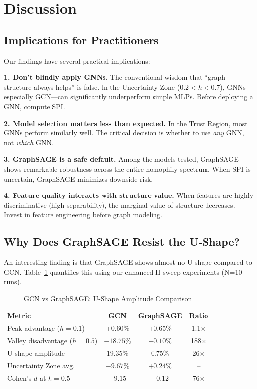 
\section{Discussion}
\label{sec:discussion}

\subsection{Implications for Practitioners}

Our findings have several practical implications:

\textbf{1. Don't blindly apply GNNs.} The conventional wisdom that ``graph structure always helps'' is false. In the Uncertainty Zone ($0.2 < h < 0.7$), GNNs---especially GCN---can significantly underperform simple MLPs. Before deploying a GNN, compute SPI.

\textbf{2. Model selection matters less than expected.} In the Trust Region, most GNNs perform similarly well. The critical decision is whether to use \textit{any} GNN, not \textit{which} GNN.

\textbf{3. GraphSAGE is a safe default.} Among the models tested, GraphSAGE shows remarkable robustness across the entire homophily spectrum. When SPI is uncertain, GraphSAGE minimizes downside risk.

\textbf{4. Feature quality interacts with structure value.} When features are highly discriminative (high separability), the marginal value of structure decreases. Invest in feature engineering before graph modeling.

\subsection{Why Does GraphSAGE Resist the U-Shape?}

An interesting finding is that GraphSAGE shows almost no U-shape compared to GCN. Table~\ref{tab:sage_gcn_comparison} quantifies this using our enhanced H-sweep experiments (N=10 runs).

\begin{table}[h]
\centering
\caption{GCN vs GraphSAGE: U-Shape Amplitude Comparison}
\label{tab:sage_gcn_comparison}
\small
\begin{tabular}{@{}lccc@{}}
\toprule
\textbf{Metric} & \textbf{GCN} & \textbf{GraphSAGE} & \textbf{Ratio} \\
\midrule
Peak advantage ($h=0.1$) & +0.60\% & +0.65\% & 1.1$\times$ \\
Valley disadvantage ($h=0.5$) & $-18.75\%$ & $-0.10\%$ & 188$\times$ \\
U-shape amplitude & 19.35\% & 0.75\% & 26$\times$ \\
\midrule
Uncertainty Zone avg. & $-9.67\%$ & $+0.24\%$ & -- \\
Cohen's $d$ at $h=0.5$ & $-9.15$ & $-0.12$ & 76$\times$ \\
\bottomrule
\end{tabular}
\end{table}

